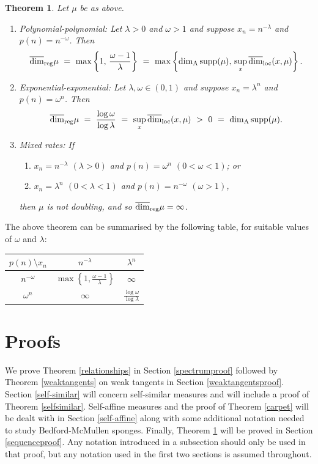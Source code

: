 \documentclass[12pt]{amsart}
\numberwithin{equation}{section}
\newtheorem{thm}{Theorem}[section]
\renewcommand{\r}{\overline{\dim}_{\textup{reg}} \mu}
\renewcommand{\a}{\dim_{\textup{A}}}
\begin{document}
\begin{thm}\label{sequences}
Let $\mu$ be as above.
\begin{enumerate}
\item Polynomial-polynomial: Let $\lambda > 0$ and $\omega > 1$ and suppose $x_n = n^{-\lambda}$ and $p(n)=n^{-\omega}$.  Then
\[
\r \ = \  \max \left\{1, \, \frac{\omega-1}{\lambda}\right\} \  =\  \max \left\{\a \textup{supp} (\mu), \, \sup_x \overline{\dim}_{\textup{loc}}(x,\mu)\right\}.
\]
\item Exponential-exponential: Let $\lambda, \omega \in (0,1)$ and suppose $x_n= \lambda^{n}$ and $p(n)=\omega^{n}$.  Then
\[
\r \ = \  \frac{\log \omega}{\log \lambda}  \ = \ \sup_x \overline{\dim}_{\textup{loc}}(x,\mu) \ >  \     0 \ = \ \a \textup{supp} (\mu) .
\]
\item Mixed rates: If
\begin{enumerate}
\item[(i)] $x_n = n^{-\lambda}$ $(\lambda >0)$ and $p(n)=\omega^{n}$ $(0< \omega < 1)$; or
\item[(ii)]  $x_n =  \lambda^{n}$ $(0< \lambda < 1)$ and $p(n)=n^{-\omega}$ $(\omega >1)$,
\end{enumerate}
then $\mu$ is not doubling, and so  $\r = \infty$.
\end{enumerate}
\end{thm}


The above theorem can be summarised by the following table, for suitable values of $\omega$ and $\lambda$:


\begin{table}[h]
\centering
\label{sequencetable}
\begin{tabular}{c|cc}
$p(n) \setminus x_n$ & $n^{-\lambda}$             & $\lambda^n$                        \\ \hline
$n^{-\omega}$       & $\max \left\{1,\frac{\omega - 1}{\lambda}\right\}$ & $\infty$\\
$\omega^n$          & $\infty$                         & $\frac{\log \omega}{\log \lambda}$
\end{tabular}
\end{table}



\section{Proofs} \label{proof}

We prove Theorem \ref{relationships} in Section \ref{spectrumproof} followed by Theorem \ref{weaktangents} on weak tangents in Section \ref{weaktangentsproof}. Section \ref{self-similar} will concern self-similar measures and will include a proof of Theorem \ref{selfsimilar}. Self-affine measures and the proof of Theorem \ref{carpet} will be dealt with in Section \ref{self-affine} along with some additional notation needed to study Bedford-McMullen sponges. Finally, Theorem \ref{sequences} will be proved in Section \ref{sequenceproof}. Any notation introduced in a subsection should only be used in that proof, but any notation used in the first two sections is assumed throughout.
\end{document}

